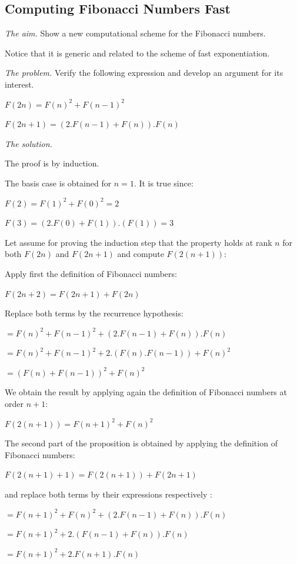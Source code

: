 \subsection{Computing Fibonacci Numbers Fast}
\label{sec:FastFibo}

\noindent \textit{The aim.} 
Show a new computational scheme for the Fibonacci numbers.

Notice that it is generic and related to the scheme of fast exponentiation.
\medskip


\noindent \textit{The problem.} Verify the following expression and develop an argument for its interest.

$F(2n) = F(n)^2 + F(n-1)^2$

$F(2n+1) = (2.F(n-1) + F(n)).F(n)$
\medskip

\noindent \textit{The solution.}

The proof is by induction.

The basis case is obtained for $n=1$.
It is true since:

$F(2) = F(1)^2+F(0)^2 = 2$

$F(3) = (2.F(0)+F(1)).(F(1)) = 3$
\medskip

Let assume for proving the induction step that the property holds at rank $n$ for both $F(2n)$ and $F(2n+1)$ and compute $F(2(n+1))$:

Apply first the definition of Fibonacci numbers: 

$F(2n+2) = F(2n+1)+F(2n)$ 

Replace both terms by the recurrence hypothesis:

$= F(n)^2 + F(n-1)^2 + (2.F(n-1) + F(n)).F(n)$

$= F(n)^2 + F(n-1)^2 + 2.(F(n).F(n-1)) + F(n)^2$

$= (F(n) + F(n-1))^2 + F(n)^2$

We obtain the result by applying again the definition of Fibonacci numbers at order $n+1$:

$F(2(n+1)) = F(n+1)^2 + F(n)^2$
\medskip

The second part of the proposition is obtained by applying the definition of Fibonacci numbers:

$F(2(n+1)+1) = F(2(n+1)) + F(2n+1)$

and replace both terms by their expressions respectively :

$= F(n+1)^2 + F(n)^2 + (2.F(n-1) + F(n)).F(n)$

$= F(n+1)^2 + 2.(F(n-1) + F(n)).F(n)$

$= F(n+1)^2 + 2.F(n+1).F(n)$
\medskip

